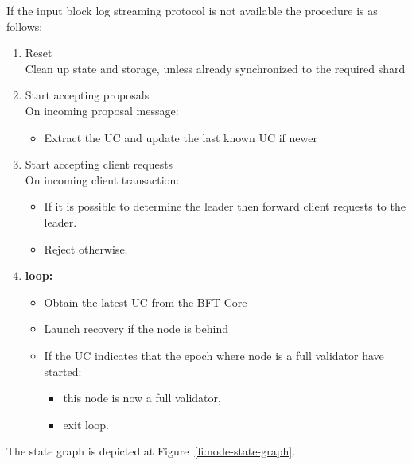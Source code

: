 If the input block log streaming protocol is not available the procedure is as follows:

\begin{shaded}
  \begin{enumerate}[nosep]
    \item Reset \\
          Clean up state and storage, unless already synchronized to the required shard
    \item Start accepting proposals \\
          On incoming proposal message:
          \begin{itemize}[nosep]
            \item Extract the UC and update the last known UC if newer
          \end{itemize}
    \item Start accepting client requests \\
          On incoming client transaction:
          \begin{itemize}[nosep]
            \item If it is possible to determine the leader then forward client requests to the leader.
            \item Reject otherwise.
          \end{itemize}
    \item \textbf{loop:}
    \begin{itemize}[nosep]
      \item Obtain the latest UC from the BFT Core
      \item Launch recovery if the node is behind
      \item If the UC indicates that the epoch where node is a full validator have started:
      \begin{itemize}[nosep]
        \item this node is now a full validator,
        \item exit loop.
      \end{itemize}
    \end{itemize}
  \end{enumerate}
\end{shaded}

The state graph is depicted at Figure~\ref{fi:node-state-graph}.

